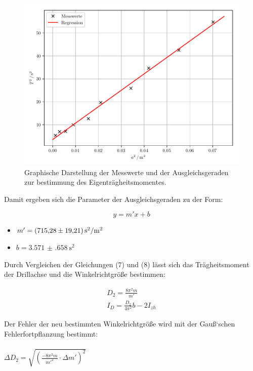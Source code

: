 \begin{figure}[H]
  \centering
  \includegraphics[width=\textwidth]{ausgleichsgerade1.pdf}
  \caption{Graphische Darstellung der Messwerte und der Ausgleichsgeraden zur bestimmung
  des Eigenträgheitsmomentes.}
\end{figure}

Damit ergeben sich die Parameter der Ausgleichsgeraden zu der Form:

\begin{equation}
  y = m'x + b
\end{equation}

\begin{itemize}
  \item $m' = \SI{715.28(1921)}{\second\squared\per{\meter\squared}}$
  \item $b = \SI{3.571(658)}{\second\squared}$
\end{itemize}

Durch Vergleichen der Gleichungen (7) und (8) lässt sich das Trägheitsmoment der
Drillachse und die Winkelrichtgröße bestimmen:

\begin{gather}
  D_2 = \frac{8\pi^2m}{m'} \\
  I_D = \frac{D_2}{4\pi^2}b - 2I_{zh}
\end{gather}

Der Fehler der neu bestimmten Winkelrichtgröße wird mit der Gauß`schen Fehlerfortpflanzung
bestimmt:\\\\

$\Delta D_2 = \sqrt{\left(\frac{-8\pi^2m}{m'^2} \cdot \Delta m' \right)^2}$\\\\

